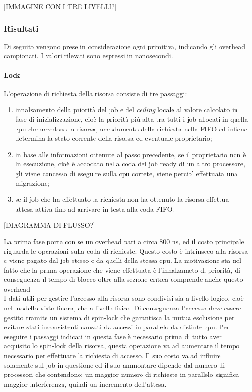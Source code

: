 [IMMAGINE CON I TRE LIVELLI?]

\subsubsection{Risultati}
\label{sec:overhead_ris}

\noindent Di seguito vengono prese in considerazione ogni primitiva, indicando gli overhead campionati. I valori rilevati sono espressi in nanosecondi.

\paragraph{Lock}  L'operazione di richiesta della risorsa consiste di tre passaggi:

\begin{enumerate}
	\item innalzamento della priorità del job e del \textit{ceiling} locale al valore calcolato in fase di inizializzazione, cioè la priorità più alta tra tutti i job allocati in quella cpu che accedono la risorsa, accodamento della richiesta nella FIFO ed infiene determina la stato corrente della risorsa ed eventuale proprietario;
	\item in base alle informazioni ottenute al passo precedente, se il proprietario non è in esecuzione, cioè è accodato nella coda dei job ready di un altro processore, gli viene concesso di eseguire sulla cpu correte, viene percio' effettuata una migrazione;
	\item se il job che ha effettuato la richiesta non ha ottenuto la risorsa effettua attesa attiva fino ad arrivare in testa alla coda FIFO.
\end{enumerate}

[DIAGRAMMA DI FLUSSO?]

\noindent La prima fase porta con se un overhead pari a circa 800 ns, ed il costo principale riguarda le operazioni sulla coda di richieste. Questo costo è intrinseco alla risorsa e viene pagato dal job stesso e da quelli della stessa cpu. La motivazione sta nel fatto che la prima operazione che viene effettuata è l'innalzameto di priorità, di conseguenza il tempo di blocco oltre alla sezione critica comprende anche questo overhead.\\

\noindent I dati utili per gestire l'accesso alla risorsa sono condivisi sia a livello logico, cioè nel modello visto finora, che a livello fisico. Di conseguenza l'accesso deve essere gestito tramite un sistema di spin-lock che garantisca la mutua esclusione per evitare stati inconsistenti causati da accessi in parallelo da distinte cpu. Per eseguire i passaggi indicati in questa fase è necessario prima di tutto aver acquisito lo spin-lock della risorsa, questa operazione va ad aumentare il tempo necessario per effettuare la richiesta di accesso. Il suo costo va ad influire solamente sul job in questione ed il suo ammontare dipende dal numero di processori che contendono: un maggior numero di richieste in parallelo significa maggior interferenza, quindi un incremento dell'attesa.\\

